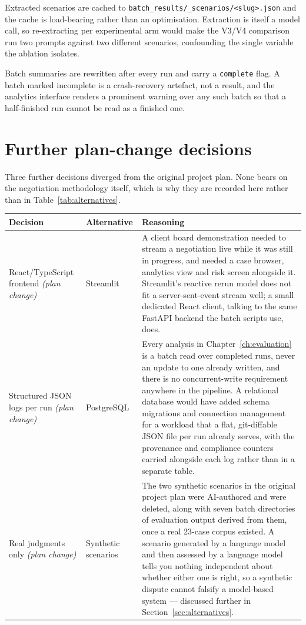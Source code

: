 Extracted scenarios are cached to \texttt{batch\_results/\_scenarios/<slug>.json}
and the cache is load-bearing rather than an optimisation. Extraction is itself a
model call, so re-extracting per experimental arm would make the V3/V4 comparison
run two prompts against two different scenarios, confounding the single variable
the ablation isolates.

Batch summaries are rewritten after every run and carry a \texttt{complete} flag.
A batch marked incomplete is a crash-recovery artefact, not a result, and the
analytics interface renders a prominent warning over any such batch so that a
half-finished run cannot be read as a finished one.

\section{Further plan-change decisions}
\label{app:further-decisions}

Three further decisions diverged from the original project plan. None bears
on the negotiation methodology itself, which is why they are recorded here
rather than in Table~\ref{tab:alternatives}.

\begin{table}[htbp]
\centering
\footnotesize
\begin{tabularx}{\textwidth}{@{}>{\raggedright\arraybackslash}p{3.0cm}>{\raggedright\arraybackslash}p{2.4cm}X@{}}
\toprule
\textbf{Decision} & \textbf{Alternative} & \textbf{Reasoning} \\
\midrule
React/TypeScript frontend \emph{(plan change)} & Streamlit &
 A client board demonstration needed to stream a negotiation live while it
 was still in progress, and needed a case browser, analytics view and risk
 screen alongside it. Streamlit's reactive rerun model does not fit a
 server-sent-event stream well; a small dedicated React client, talking to
 the same FastAPI backend the batch scripts use, does. \\
Structured JSON logs per run \emph{(plan change)} & PostgreSQL &
 Every analysis in Chapter~\ref{ch:evaluation} is a batch read over
 completed runs, never an update to one already written, and there is no
 concurrent-write requirement anywhere in the pipeline. A relational database
 would have added schema migrations and connection management for a workload
 that a flat, git-diffable JSON file per run already serves, with the
 provenance and compliance counters carried alongside each log rather than
 in a separate table. \\
Real judgments only \emph{(plan change)} & Synthetic scenarios &
 The two synthetic scenarios in the original project plan were AI-authored
 and were deleted, along with seven batch directories of evaluation output
 derived from them, once a real 23-case corpus existed. A scenario generated
 by a language model and then assessed by a language model tells you
 nothing independent about whether either one is right, so a synthetic
 dispute cannot falsify a model-based system --- discussed further in
 Section~\ref{sec:alternatives}. \\
\bottomrule
\end{tabularx}
\end{table}


